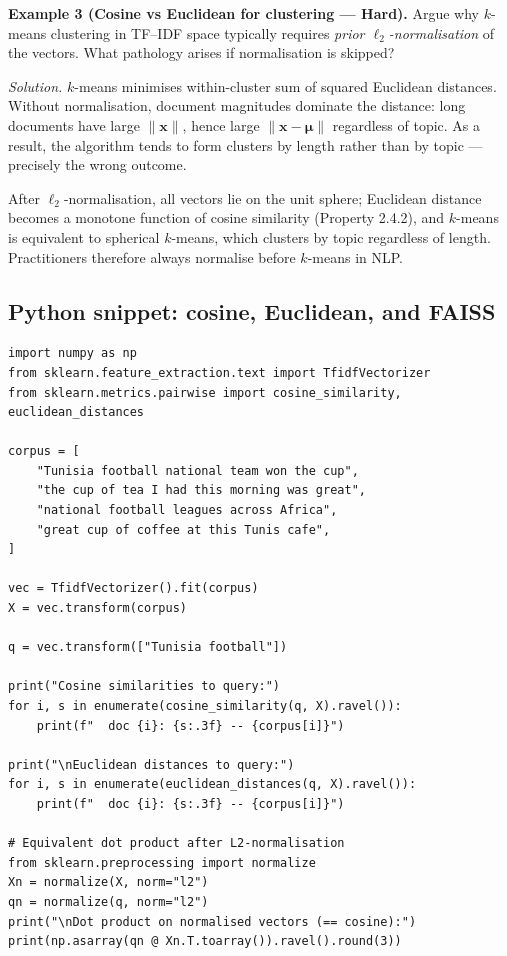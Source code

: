 \documentclass[12pt,a4paper]{report}
\theoremstyle{definition}
\theoremstyle{remark}
\begin{document}
\medskip

\textbf{Example 3 (Cosine vs Euclidean for clustering --- Hard).}
Argue why $k$-means clustering in TF--IDF space typically requires \emph{prior $\ell_2$-normalisation} of the vectors. What pathology arises if normalisation is skipped?

\textit{Solution.} $k$-means minimises within-cluster sum of squared Euclidean distances. Without normalisation, document magnitudes dominate the distance: long documents have large $\|\mathbf{x}\|$, hence large $\|\mathbf{x} - \boldsymbol{\mu}\|$ regardless of topic. As a result, the algorithm tends to form clusters by length rather than by topic --- precisely the wrong outcome.

After $\ell_2$-normalisation, all vectors lie on the unit sphere; Euclidean distance becomes a monotone function of cosine similarity (Property 2.4.2), and $k$-means is equivalent to spherical $k$-means, which clusters by topic regardless of length. Practitioners therefore always normalise before $k$-means in NLP.

\subsection{Python snippet: cosine, Euclidean, and FAISS}

\begin{lstlisting}
import numpy as np
from sklearn.feature_extraction.text import TfidfVectorizer
from sklearn.metrics.pairwise import cosine_similarity, euclidean_distances

corpus = [
    "Tunisia football national team won the cup",
    "the cup of tea I had this morning was great",
    "national football leagues across Africa",
    "great cup of coffee at this Tunis cafe",
]

vec = TfidfVectorizer().fit(corpus)
X = vec.transform(corpus)

q = vec.transform(["Tunisia football"])

print("Cosine similarities to query:")
for i, s in enumerate(cosine_similarity(q, X).ravel()):
    print(f"  doc {i}: {s:.3f} -- {corpus[i]}")

print("\nEuclidean distances to query:")
for i, s in enumerate(euclidean_distances(q, X).ravel()):
    print(f"  doc {i}: {s:.3f} -- {corpus[i]}")

# Equivalent dot product after L2-normalisation
from sklearn.preprocessing import normalize
Xn = normalize(X, norm="l2")
qn = normalize(q, norm="l2")
print("\nDot product on normalised vectors (== cosine):")
print(np.asarray(qn @ Xn.T.toarray()).ravel().round(3))
\end{lstlisting}
\end{document}
